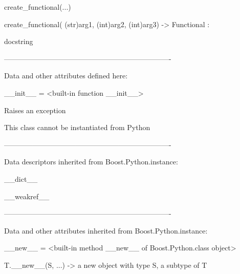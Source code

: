 \documentclass[letterpaper,10pt,english]{sphinxmanual}
\begin{document}
\begin{description}
\begin{description}
\begin{DUlineblock}{0em}
\begin{DUlineblock}{\DUlineblockindent}
\end{DUlineblock}
\item[] create\_functional(...)
\item[]
\begin{DUlineblock}{\DUlineblockindent}
\item[] create\_functional( (str)arg1, (int)arg2, (int)arg3) -\textgreater{} Functional :
\item[]
\begin{DUlineblock}{\DUlineblockindent}
\item[] docstring
\item[] 
\end{DUlineblock}
\end{DUlineblock}
\item[] ----------------------------------------------------------------------
\item[] Data and other attributes defined here:
\item[] 
\item[] \_\_init\_\_ = \textless{}built-in function \_\_init\_\_\textgreater{}
\item[]
\begin{DUlineblock}{\DUlineblockindent}
\item[] Raises an exception
\item[] This class cannot be instantiated from Python
\item[] 
\end{DUlineblock}
\item[] ----------------------------------------------------------------------
\item[] Data descriptors inherited from Boost.Python.instance:
\item[] 
\item[] \_\_dict\_\_
\item[] 
\item[] \_\_weakref\_\_
\item[] 
\item[] ----------------------------------------------------------------------
\item[] Data and other attributes inherited from Boost.Python.instance:
\item[] 
\item[] \_\_new\_\_ = \textless{}built-in method \_\_new\_\_ of Boost.Python.class object\textgreater{}
\item[]
\begin{DUlineblock}{\DUlineblockindent}
\item[] T.\_\_new\_\_(S, ...) -\textgreater{} a new object with type S, a subtype of T
\end{DUlineblock}
\end{DUlineblock}


\end{description}
\end{description}
\end{document}
